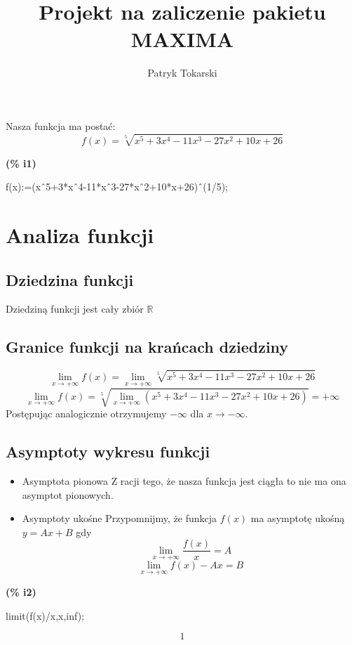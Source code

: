 \documentclass[a4paper]{article}
\author{Patryk Tokarski}
\title{Projekt na zaliczenie pakietu MAXIMA}
\begin{document}
\maketitle
\newpage


{\Large Nasza funkcja ma postać:}
\begin{equation*}
	f(x)=\sqrt[5]{x^5+3x^4-11x^3-27x^2+10x+26}
\end{equation*}

\noindent
\begin{minipage}[t]{4.000000em}\color{red}\bfseries
(\% i1)	
\end{minipage}
\begin{minipage}[t]{\textwidth}\color{blue}
f(x):=(x\^\ 5+3*x\^\ 4-11*x\^\ 3-27*x\^\ 2+10*x+26)\^\ (1/5);
\end{minipage}

\section{Analiza funkcji} 
\subsection{Dziedzina funkcji}
Dziedziną funkcji jest cały zbiór $\mathds{R}$
\subsection{Granice funkcji na krańcach dziedziny}

\[
	\lim_{x\to +\infty} f(x) = \lim_{x\to +\infty} \sqrt[5]{x^5+3x^4-11x^3-27x^2+10x+26} 	
\]
\[
	\lim_{x\to +\infty} f(x) = \sqrt[5]{\lim_{x\to +\infty} (x^5+3x^4-11x^3-27x^2+10x+26) } = +\infty
\]
Postępując analogicznie otrzymujemy $-\infty$ dla $x \to -\infty$.	
\subsection{Asymptoty wykresu funkcji}
\begin{itemize}
	\item Asymptota pionowa
		Z racji tego, że nasza funkcja jest ciągła to nie ma ona asymptot pionowych.
	\item Asymptoty ukośne 
		Przypomnijmy, że funkcja $f(x)$ ma asymptotę ukośną $y=Ax+B$ gdy \[\lim_{x \to +\infty} \frac{f(x)}{x} = A\]  \[\lim_{x\to +\infty}f(x)-Ax=B\]

\end{itemize}

\noindent
\begin{minipage}[t]{4.000000em}\color{red}\bfseries
(\% i2)	
\end{minipage}
\begin{minipage}[t]{\textwidth}\color{blue}
limit(f(x)/x,x,inf);
\end{minipage}
\[\displaystyle \tag{\% o2} 
1\mbox{}
\]
\end{document}
